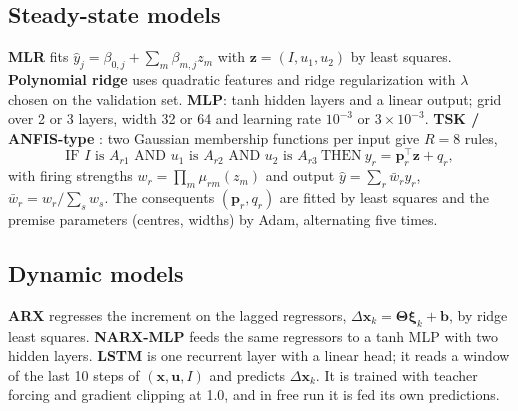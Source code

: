 \documentclass[11pt,a4paper]{article}
\begin{document}
\subsection{Steady-state models}
\textbf{MLR} fits $\hat y_j=\beta_{0,j}+\sum_m\beta_{m,j}z_m$ with $\bm z=(I,u_1,u_2)$ by least squares. \textbf{Polynomial ridge} uses quadratic features and ridge regularization with $\lambda$ chosen on the validation set. \textbf{MLP}: tanh hidden layers and a linear output; grid over 2 or 3 layers, width 32 or 64 and learning rate $10^{-3}$ or $3\times10^{-3}$. \textbf{TSK / ANFIS-type} \cite{takagi1985,jang1993}: two Gaussian membership functions per input give $R=8$ rules,
\begin{equation}
\text{IF } I \text{ is } A_{r1}\text{ AND }u_1\text{ is }A_{r2}\text{ AND }u_2\text{ is }A_{r3}\ \text{THEN}\ y_r=\bm p_r^{\top}\bm z+q_r,
\end{equation}
with firing strengths $w_r=\prod_m\mu_{rm}(z_m)$ and output $\hat y=\sum_r\bar w_r y_r$, $\bar w_r=w_r/\sum_s w_s$. The consequents $(\bm p_r,q_r)$ are fitted by least squares and the premise parameters (centres, widths) by Adam, alternating five times.

\subsection{Dynamic models}
\textbf{ARX} regresses the increment on the lagged regressors, $\Delta\bm x_k=\bm\Theta\bm\xi_k+\bm b$, by ridge least squares. \textbf{NARX-MLP} feeds the same regressors to a tanh MLP with two hidden layers. \textbf{LSTM} \cite{hochreiter1997} is one recurrent layer with a linear head; it reads a window of the last 10 steps of $(\bm x,\bm u,I)$ and predicts $\Delta\bm x_k$. It is trained with teacher forcing and gradient clipping at 1.0, and in free run it is fed its own predictions.
\end{document}
